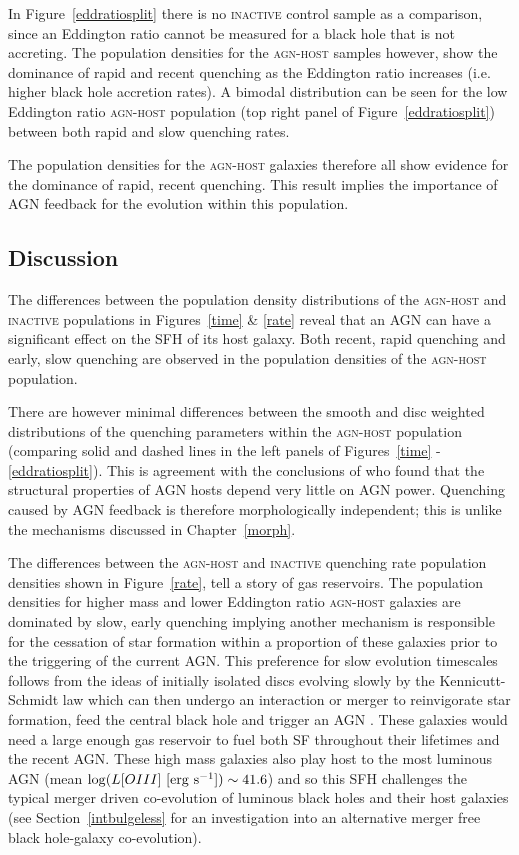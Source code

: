 In Figure~\ref{eddratiosplit} there is no \textsc{inactive} control sample as a comparison, since an Eddington ratio cannot be measured for a black hole that is not accreting. The population densities for the \textsc{agn-host} samples however, show the dominance of rapid and recent quenching as the Eddington ratio increases (i.e. higher black hole accretion rates). A bimodal distribution can be seen for the low Eddington ratio \textsc{agn-host} population (top right panel of Figure~\ref{eddratiosplit}) between both rapid and slow quenching rates. 

The population densities for the \textsc{agn-host} galaxies therefore all show evidence for the dominance of rapid, recent quenching. This result implies the importance of AGN feedback for the evolution within this population.

\subsection{Discussion}\label{dis}

The differences between the population density distributions of the \textsc{agn-host} and \textsc{inactive} populations in Figures~\ref{time} \& \ref{rate} reveal that an AGN can have a significant effect on the SFH of its host galaxy. Both recent, rapid quenching and early, slow quenching are observed in the population densities of the \textsc{agn-host} population. 

There are however minimal differences between the smooth and disc weighted distributions of the quenching parameters within the \textsc{agn-host} population (comparing solid and dashed lines in the left panels of Figures~\ref{time} - \ref{eddratiosplit}). This is agreement with the conclusions of \citet{kauffmann03b} who found that the structural properties of AGN hosts depend very little on AGN power. Quenching caused by AGN feedback is therefore morphologically independent; this is unlike the mechanisms discussed in Chapter~\ref{morph}.

The differences between the \textsc{agn-host} and \textsc{inactive} quenching rate population densities shown in Figure~\ref{rate}, tell a story of gas reservoirs. The population densities for higher mass and lower Eddington ratio \textsc{agn-host} galaxies are dominated by slow, early quenching implying another mechanism is responsible for the cessation of star formation within a proportion of these galaxies prior to the triggering of the current AGN.  This preference for slow evolution timescales follows from the ideas of initially isolated discs evolving slowly by the Kennicutt-Schmidt \citep{Schmidt59, Kennicutt97} law which can then undergo an interaction or merger to reinvigorate star formation, feed the central black hole and trigger an AGN \citep{Varela04, emsellem15}. These galaxies would need a large enough gas reservoir to fuel both SF throughout their lifetimes and the recent AGN. These high mass galaxies also play host to the most luminous AGN (mean $\log (L[OIII] ~[\rm{erg}~s^{-1}]) \sim 41.6$) and so this SFH challenges the typical merger driven co-evolution of luminous black holes and their host galaxies (see Section~\ref{intbulgeless} for an investigation into an alternative merger free black hole-galaxy co-evolution). 



